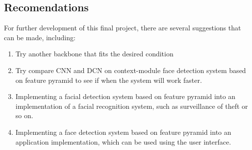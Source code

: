 \subsection{Recomendations}

For further development of this final project, there are several suggestions that can be made, including:

\begin{enumerate}[nolistsep]

  \item Try another backbone that fits the desired condition

  \item Try compare CNN and DCN on context-module face detection system based on feature pyramid to see if when
  the system will work faster.

  \item Implementing a facial detection system based on feature pyramid into an implementation of a facial recognition system, such as surveillance of theft or so on.
  
  \item Implementing a face detection system based on feature pyramid into an application implementation, which can be used using the user interface.

\end{enumerate}

